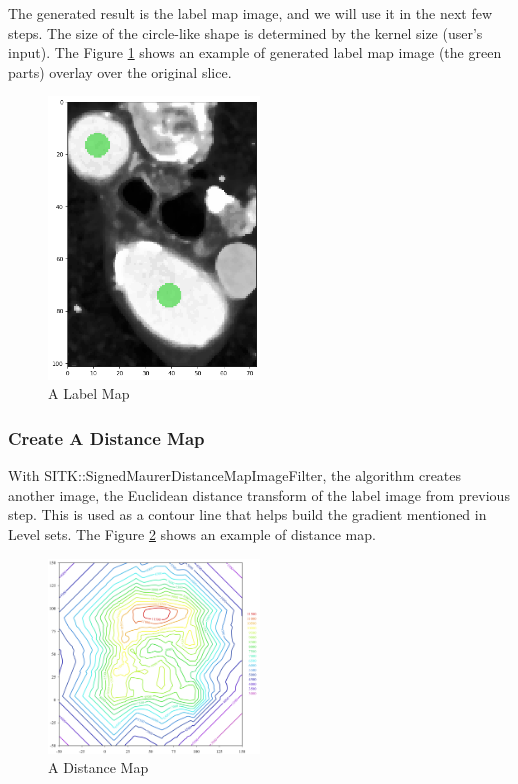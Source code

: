 The generated result is the label map image, and we will use it in the next few steps. The size of the circle-like shape is determined by the kernel size (user's input). The Figure \ref{fig_label_map} shows an example of generated label map image (the green parts) overlay over the original slice.

\begin{figure}[H]
    \centering
    \includegraphics[width=0.5\textwidth]{figures/AGR/label_image.png}
    \caption[A label image]{A Label Map}
    \label{fig_label_map}
\end{figure}

\subsubsection{Create A Distance Map}\label{distance_map}
With SITK::SignedMaurerDistanceMapImageFilter, the algorithm creates another image, the Euclidean distance transform of the label image from previous step. This is used as a contour line that helps build the gradient mentioned in Level sets. The Figure \ref{fig_distance_map} shows an example of distance map.

\begin{figure}[H]
    \centering
    \includegraphics[width=0.5\textwidth]{figures/AGR/Contour2D.png}
    \caption[A Distance Map]{A Distance Map}
    \label{fig_distance_map}
\end{figure}

